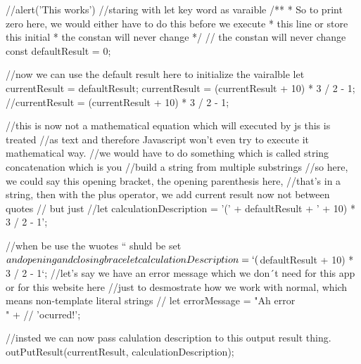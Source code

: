 //alert('This works')
//staring with let key word as varaible 
/**
 * So to print zero here, we would  either have to do this before we execute 
 * this line or store this initial
 * the constan will never change 
 */
// the constan will never change 
const defaultResult = 0;

//now we can use the  default result here to initialize  the vairalble 
let currentResult = defaultResult;
currentResult = (currentResult + 10) * 3 / 2 - 1;
//currentResult = (currentResult + 10) * 3 / 2 - 1;

//this is now not a mathematical equation  which will executed by js this is treated
//as text and therefore Javascript won't even try to execute it mathematical way.
//we would have to do  something  which is called string concatenation which is you 
//build a string from multiple substrings 
//so here, we could  say this opening bracket, the opening parenthesis here,
//that's in a string, then with the plus operator, we add current result now not between quotes
// but just 
//let calculationDescription = '(' + defaultResult + ' + 10) * 3 / 2 - 1';

//when  be use the wuotes `` shuld be set $ and opening and closing brace
let calculationDescription = `(${defaultResult}  + 10)  * 3 / 2 - 1`;
//let's say we have an error  message which we don´t need for this app or for  this  website  here 
//just to desmostrate how we work with normal, which means non-template literal strings
// let errorMessage = "Ah error \\" + 
//                    'ocurred!';


//insted we can now pass  calulation description to this output result thing.
outPutResult(currentResult, calculationDescription);

